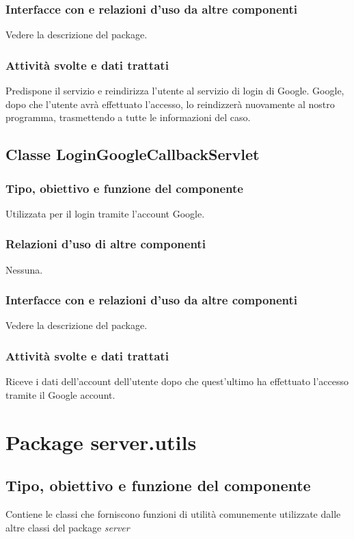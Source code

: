 \subsubsection*{Interfacce con e relazioni d'uso da altre componenti}
Vedere la descrizione del package.
\subsubsection*{Attivit\`a svolte e dati trattati}
Predispone il servizio e reindirizza l'utente al servizio di login di Google.
Google, dopo che l'utente avr\`a effettuato l'accesso, lo reindizzer\`a nuovamente
al nostro programma, trasmettendo a  tutte le
informazioni del caso.


\subsection{Classe LoginGoogleCallbackServlet}
\subsubsection*{Tipo, obiettivo e funzione del componente}
Utilizzata per il login tramite l'account Google.
\subsubsection*{Relazioni d'uso di altre componenti}
Nessuna.
\subsubsection*{Interfacce con e relazioni d'uso da altre componenti}
Vedere la descrizione del package.
\subsubsection*{Attivit\`a svolte e dati trattati}
Riceve i dati dell'account dell'utente dopo che quest'ultimo ha effettuato
l'accesso tramite il Google account.


\section{Package server.utils} %
\subsection*{Tipo, obiettivo e funzione del componente}
Contiene le classi che forniscono funzioni di utilit\`a comunemente utilizzate
dalle altre classi del package \emph{server}

